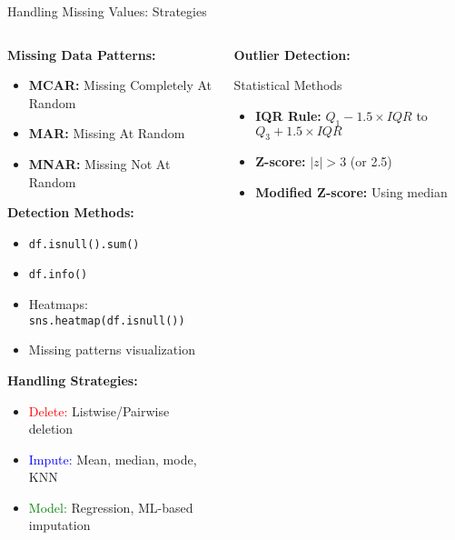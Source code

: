 \documentclass[8pt,aspectratio=1610]{beamer}
\begin{document}
\begin{frame}{Handling Missing Values: Strategies}
\begin{columns}[t]
\begin{column}{0.5\textwidth}
\textbf{Missing Data Patterns:}
\begin{itemize}
\setlength{\itemsep}{1pt}
\item \textbf{MCAR:} Missing Completely At Random
\item \textbf{MAR:} Missing At Random
\item \textbf{MNAR:} Missing Not At Random
\end{itemize}

\vspace{0.3cm}
\textbf{Detection Methods:}
\begin{itemize}
\setlength{\itemsep}{1pt}
\item \texttt{df.isnull().sum()}
\item \texttt{df.info()}
\item Heatmaps: \texttt{sns.heatmap(df.isnull())}
\item Missing patterns visualization
\end{itemize}

\vspace{0.3cm}
\textbf{Handling Strategies:}
\begin{itemize}
\setlength{\itemsep}{1pt}
\item \textcolor{red}{Delete:} Listwise/Pairwise deletion
\item \textcolor{blue}{Impute:} Mean, median, mode, KNN
\item \textcolor{green}{Model:} Regression, ML-based imputation
\end{itemize}
\end{column}

\begin{column}{0.48\textwidth}
\textbf{Outlier Detection:}
\vspace{0.2cm}

\begin{block}{Statistical Methods}
\begin{itemize}
\setlength{\itemsep}{1pt}
\item \textbf{IQR Rule:} $Q_1 - 1.5 \times IQR$ to $Q_3 + 1.5 \times IQR$
\item \textbf{Z-score:} $|z| > 3$ (or 2.5)
\item \textbf{Modified Z-score:} Using median
\end{itemize}
\end{block}


\end{column}
\end{columns}
\end{frame}
\end{document}

